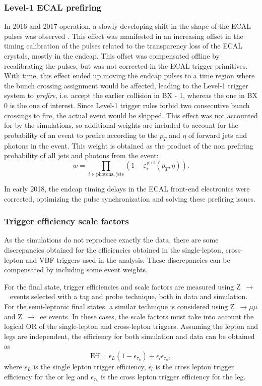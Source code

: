 \documentclass[../main.tex]{subfiles}
\begin{document}
\subsubsection*{Level-1 ECAL prefiring}

In 2016 and 2017 operation, a slowly developing shift in the shape of the ECAL pulses was observed \cite{intro:l1_13tev}. This effect was manifested in an increasing offset in the timing calibration of the pulses related to the transparency loss of the ECAL crystals, mostly in the endcap. This offset was compensated offline by recalibrating the pulses, but was not corrected in the ECAL trigger primitives. With time, this effect ended up moving the endcap pulses to a time region where the bunch crossing assignment would be affected, leading to the Level-1 trigger system to \textit{prefire}, i.e. accept the earlier collision in BX - 1, whereas the one in BX 0 is the one of interest. Since Level-1 trigger rules forbid two consecutive bunch crossings to fire, the actual event would be skipped. This effect was not accounted for by the simulations, so additional weights are included to account for the probability of an event to prefire according to the $p_T$ and $\eta$ of forward jets and photons in the event. This weight is obtained as the product of the non prefiring probability of all jets and photons from the event:
\begin{equation}
w = \prod_{i\in \text{photons, jets}} (1 - \varepsilon_i^\text{pref}(p_T, \eta)).
\end{equation}

In early 2018, the endcap timing delays in the ECAL front-end electronics were corrected, optimizing the pulse synchronization and solving these prefiring issues.

\subsubsection*{Trigger efficiency scale factors}
\label{hh:sec:trigger_sf}

As the simulations do not reproduce exactly the data, there are some discrepancies obtained for the efficiencies obtained in the single-lepton, cross-lepton and VBF triggers used in the analysis. These discrepancies can be compensated by including some event weights.

For the \tauh\tauh{} final state, trigger efficiencies and scale factors are measured using Z~$\to$~\taumu\tauh{} events selected with a tag and probe technique, both in data and simulation. For the semi-leptonic final states, a similar technique is considered using Z~$\to\mu\mu$ and Z~$\to$~ee events. In these cases, the scale factors must take into account the logical OR of the single-lepton and cross-lepton triggers. Assuming the lepton and \tauh{} legs are independent, the efficiency for both simulation and data can be obtained as
\begin{equation}
\text{Eff} = \epsilon_L(1-\epsilon_{\tau_h}) +  \epsilon_l\epsilon_{\tau_h},
\end{equation}
where $\epsilon_L$ is the single lepton trigger efficiency, $\epsilon_l$ is the cross lepton trigger efficiency for the \taue{} or \taumu{} leg and $\epsilon_{\tau_h}$ is the cross lepton trigger efficiency for the \tauh{} leg.
\end{document}
